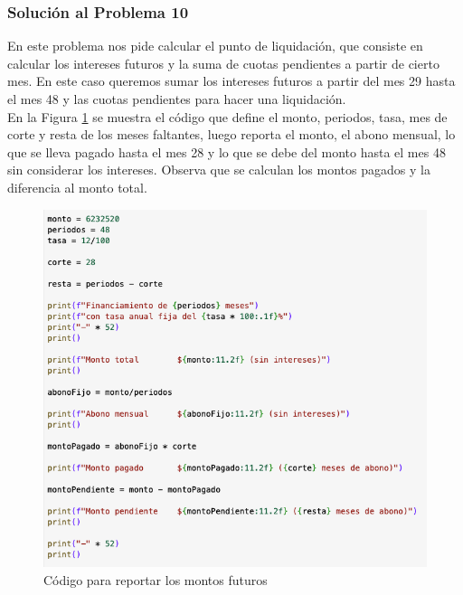 \documentclass{article}
\begin{document}
\clearpage

\subsubsection*{Solución al Problema 10}

En este problema nos pide calcular el punto de liquidación, que consiste en calcular los intereses futuros y la suma de cuotas pendientes a partir de cierto mes. En este caso queremos sumar los intereses futuros a partir del mes 29 hasta el mes 48 y las cuotas pendientes para hacer una liquidación. 
\\[12pt]
En la Figura \ref{fig:s110-1} se muestra el código que define el monto, periodos, tasa, mes de corte y resta de los meses faltantes, luego reporta el monto, el abono mensual, lo que se lleva pagado hasta el mes 28 y lo que se debe del monto hasta el mes 48 sin considerar los intereses. Observa que se calculan los montos pagados y la diferencia al monto total.
\begin{figure}[!ht]
    \centering
    \begin{minipage}{\textwidth}
        \centering
        \includegraphics[width=\textwidth]{figures/s110-1.png}
    \end{minipage}
    \captionsetup{width=\textwidth}
    \caption{Código para reportar los montos futuros}
    \label{fig:s110-1}
\end{figure}
\end{document}
